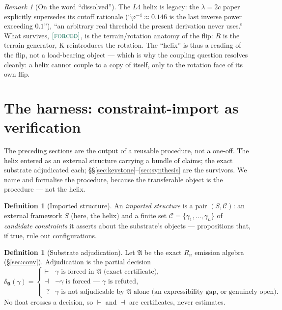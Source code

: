 \documentclass[11pt]{article}
\theoremstyle{plain}
\theoremstyle{definition}
\newtheorem{definition}[theorem]{Definition}
\theoremstyle{remark}
\newtheorem{remark}[theorem]{Remark}
\newcommand{\forced}{\textup{\textcolor{forcedc}{\textsc{[forced]}}}}
\newcommand{\Kf}{\mathrm{K}}
\begin{document}
\begin{remark}[On the word ``dissolved'']\label{rem:dissolved}
The $L4$ helix is legacy: the $\lambda=2c$ paper explicitly supersedes its cutoff rationale
(``$\varphi^{-4}\approx0.146$ is the last inverse power exceeding $0.1$''), ``an arbitrary real threshold the
present derivation never uses.'' What survives, $\forced$, is the terrain/rotation anatomy of the flip: $R$ is
the terrain generator, $\Kf$ reintroduces the rotation. The ``helix'' is thus a reading of the flip, not a
load-bearing object --- which is why the coupling question resolves cleanly: a helix cannot couple to a copy of
itself, only to the rotation face of its own flip.
\end{remark}

\section{The harness: constraint-import as verification}\label{sec:harness}

The preceding sections are the output of a reusable procedure, not a one-off. The helix entered as an external
structure carrying a bundle of claims; the exact substrate adjudicated each; \S\S\ref{sec:keystone}--\ref{sec:synthesis}
are the survivors. We name and formalise the procedure, because the transferable object is the procedure --- not
the helix.

\begin{definition}[Imported structure]\label{def:import}
An \emph{imported structure} is a pair $(S,\mathcal C)$: an external framework $S$ (here, the helix) and a
finite set $\mathcal C=\{\gamma_1,\dots,\gamma_n\}$ of \emph{candidate constraints} it asserts about the
substrate's objects --- propositions that, if true, rule out configurations.
\end{definition}

\begin{definition}[Substrate adjudication]\label{def:adjud}
Let $\mathfrak A$ be the exact $R_n$ emission algebra (\S\ref{sec:conv}). Adjudication is the partial decision
\[
\delta_{\mathfrak A}(\gamma)=
\begin{cases}
\vdash & \text{$\gamma$ is forced in $\mathfrak A$ (exact certificate),}\\
\dashv & \text{$\neg\gamma$ is forced --- $\gamma$ is refuted,}\\
\;? & \text{$\gamma$ is not adjudicable by $\mathfrak A$ alone (an expressibility gap, or genuinely open).}
\end{cases}
\]
No float crosses a decision, so $\vdash$ and $\dashv$ are certificates, never estimates.
\end{definition}
\end{document}

